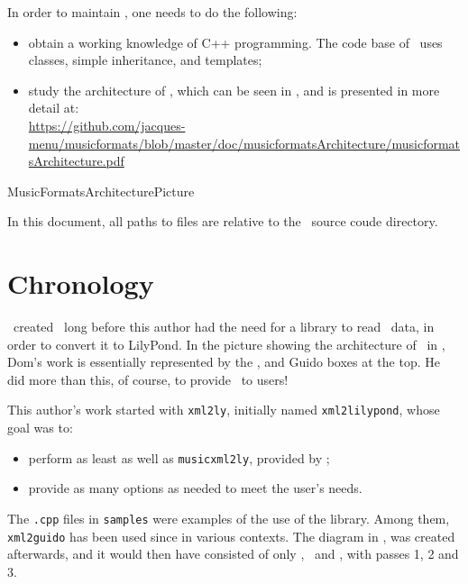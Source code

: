 In order to maintain \mf, one needs to do the following:
\begin{itemize}
\item obtain a working knowledge of C++ programming. The code base of \mf\ uses classes, simple inheritance, and templates;


\item study the architecture of \mf, which can be seen in , and is presented in more detail at:\\
\url{https://github.com/jacques-menu/musicformats/blob/master/doc/musicformatsArchitecture/musicformatsArchitecture.pdf}
\end{itemize}

{MusicFormatsArchitecturePicture}

In this document, all paths to files are relative to the \mf\ source coude directory.


\section{Chronology}

\fober\ created \libmusicxml\ long before this author had the need for a library to read \mxml\ data, in order to convert it to LilyPond.
In the picture showing the architecture of \mf\ in , Dom's work is essentially represented by the \mxml, \mxsrRepr and Guido boxes at the top. He did more than this, of course, to provide \libmusicxml\ to users!

This author's work started with {\tt xml2ly}, initially named {\tt xml2lilypond}, whose goal was to:
\begin{itemize}
\item perform as least as well as {\tt musicxml2ly}, provided by \lily;
\item provide as many options as needed to meet the user's needs.
\end{itemize}


The {\tt *.cpp} files in {\tt samples} were examples of the use of the library. Among them, {\tt xml2guido} has been used since in various contexts.
The diagram in , was created afterwards, and it would then have consisted of only \mxml, \mxsrRepr\ and \guido, with passes 1, 2 and 3.

